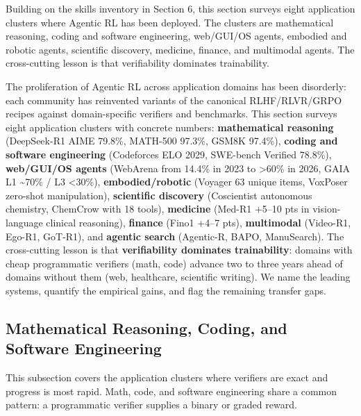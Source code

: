 \documentclass{article}
\begin{document}
Building on the skills inventory in Section 6, this section surveys eight application clusters where Agentic RL has been deployed. The clusters are mathematical reasoning, coding and software engineering, web/GUI/OS agents, embodied and robotic agents, scientific discovery, medicine, finance, and multimodal agents. The cross-cutting lesson is that verifiability dominates trainability.

The proliferation of Agentic RL across application domains has been disorderly: each community has reinvented variants of the canonical RLHF/RLVR/GRPO recipes against domain-specific verifiers and benchmarks. This section surveys eight application clusters with concrete numbers: \textbf{mathematical reasoning} (DeepSeek-R1 AIME 79.8\%, MATH-500 97.3\%, GSM8K 97.4\%), \textbf{coding and software engineering} (Codeforces ELO 2029, SWE-bench Verified 78.8\%), \textbf{web/GUI/OS agents} (WebArena from 14.4\% in 2023 to \textgreater60\% in 2026, GAIA L1 \textasciitilde70\% / L3 \textless30\%), \textbf{embodied/robotic} (Voyager 63 unique items, VoxPoser zero-shot manipulation), \textbf{scientific discovery} (Coscientist autonomous chemistry, ChemCrow with 18 tools), \textbf{medicine} (Med-R1 +5--10 pts in vision-language clinical reasoning), \textbf{finance} (Fino1 +4--7 pts), \textbf{multimodal} (Video-R1, Ego-R1, GoT-R1), and \textbf{agentic search} (Agentic-R, BAPO, ManuSearch). The cross-cutting lesson is that \textbf{verifiability dominates trainability}: domains with cheap programmatic verifiers (math, code) advance two to three years ahead of domains without them (web, healthcare, scientific writing). We name the leading systems, quantify the empirical gains, and flag the remaining transfer gaps.

\subsection{Mathematical Reasoning, Coding, and Software Engineering}\label{mathematical-reasoning-coding-and-software-engineering}

This subsection covers the application clusters where verifiers are exact and progress is most rapid. Math, code, and software engineering share a common pattern: a programmatic verifier supplies a binary or graded reward.
\end{document}
